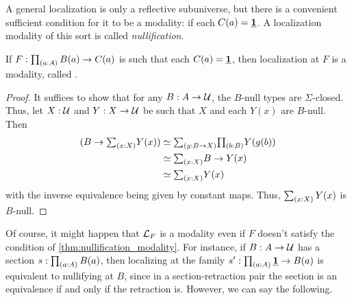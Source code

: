 A general localization is only a reflective subuniverse, but there is a convenient sufficient condition for it to be a modality: if each $C(a)=\underline{\mathbf{1}}$.
A localization modality of this sort is called \emph{nullification}.

\begin{thm}\label{thm:nullification_modality}
  If $F:\prd{a:A} B(a) \to C(a)$ is such that each $C(a)=\underline{\mathbf{1}}$, then localization at $F$ is a modality, called .
\end{thm}
\begin{proof}
  It suffices to show that for any $B:A\to\mathcal{U}$, the $B$-null types are $\Sigma$-closed.
  Thus, let $X:\mathcal{U}$ and $Y:X\to \mathcal{U}$ be such that $X$ and each $Y(x)$ are $B$-null.
  Then
  \begin{align*}
    (B\to \sm{x:X} Y(x))
    &\eqvsym \sm{g:B\to X} \prd{b:B} Y(g(b)) \\
    &\eqvsym \sm{x:X} B \to Y(x) \\
    &\eqvsym \sm{x:X} Y(x)
  \end{align*}
  with the inverse equivalence being given by constant maps.
  Thus, $\sm{x:X} Y(x)$ is $B$-null.
\end{proof}

Of course, it might happen that $\mathcal{L}_{F}$ is a modality even if $F$ doesn't satisfy the condition of \cref{thm:nullification_modality}.
For instance, if $B:A\to \mathcal{U}$ has a section $s:\prd{a:A} B(a)$, then localizing at the family $s' : \prd{a:A} \unit \to B(a)$ is equivalent to nullifying at $B$, since in a section-retraction pair the section is an equivalence if and only if the retraction is.
However, we can say the following.

